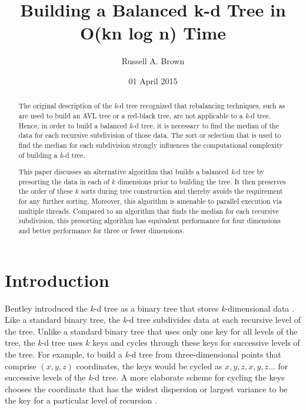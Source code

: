 \documentclass{sig-alternate}
\begin{document}
\title{Building a Balanced k-d Tree in O(kn log n) Time} 



\author{Russell A. Brown}

\date{01 April 2015}
\maketitle
\begin{abstract}

The original description of the \emph{k}-d tree recognized that rebalancing techniques, such as are used to build an AVL tree or a red-black tree, are not applicable to a \emph{k}-d tree.  Hence, in order to build a balanced \emph{k}-d tree, it is necessary to find the median of the data for each recursive subdivision of those data.  The sort or selection that is used to find the median for each subdivision strongly influences the computational complexity of building a \emph{k}-d tree.

This paper discusses an alternative algorithm that builds a balanced \emph{k}-d tree by presorting the data in each of $k$ dimensions prior to building the tree.  It then preserves the order of these $k$ sorts during tree construction and thereby avoids the requirement for any further sorting.  Moreover, this algorithm is amenable to parallel execution via multiple threads.  Compared to an algorithm that finds the median for each recursive subdivision, this presorting algorithm has equivalent performance for four dimensions and better performance for three or fewer dimensions.

\end{abstract}







\section{Introduction} 
\label{sec:introduction}

Bentley introduced the \emph{k}-d tree as a binary tree that stores \emph{k}-dimensional data \cite{Bentley}.  Like a standard binary tree, the \emph{k}-d tree subdivides data at each recursive level of the tree.  Unlike a standard binary tree that uses only one key for all levels of the tree, the \emph{k}-d tree uses $k$ keys and cycles through these keys for successive levels of the tree.  For example, to build a \emph{k}-d tree from three-dimensional points that comprise $\left(x,y,z\right)$ coordinates, the keys would be cycled as $x,y,z,x,y,z...$  for successive levels of the \emph{k}-d tree.  A more elaborate scheme for cycling the keys chooses the coordinate that has the widest dispersion or largest variance to be the key for a particular level of recursion \cite{Friedman}.
\end{document}
